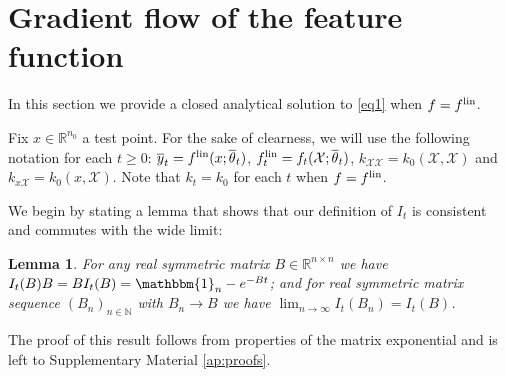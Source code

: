 \documentclass{article}
\newtheorem{lem}[thm]{Lemma}
\newtheorem{prop}[thm]{Proposition}
\theoremstyle{definition}
\theoremstyle{remark}
\numberwithin{equation}{section}
\newcommand{\X}{\mathcal{X}}
\newcommand{\R}{\mathbb{R}}
\newcommand{\N}{\mathbb{N}}
\newcommand{\ktest}{k_{x\X}}
\newcommand{\ktrain}{k_{\X\X}}
\newcommand{\lin}{{\textup{lin}}}
\newcommand{\norm}[2]{
    \|#1\|_{#2}
}
\begin{document}

\newpage

\appendix

\section{Gradient flow of the feature function}
\label{ap:eq1}

In this section we provide a closed analytical solution to \eqref{eq1} when $f = f^\lin$.

Fix $x \in \R^{n_0}$ a test point.
For the sake of clearness, we will use the following notation for each $t\ge 0$: $\overline y_t=f^\lin(x;\overline \theta_t)$, $f^\lin_t=f_t(\X;\overline \theta_t)$, $\ktrain = k_0(\X,\X)$ and $\ktest = k_0(x,\X)$.
Note that $k_t=k_0$ for each $t$ when $f=f^\lin$.

We begin by stating a lemma that shows that our definition of $I_t$ is consistent and commutes with the wide limit:
\begin{lem}\label{lem_It_properties}
    For any real symmetric matrix $B \in \R^{n \times n}$ we have $I_t(B)B=BI_t(B) = \mathbbm{1}_n - e^{-Bt}$; and for real symmetric matrix sequence $(B_n)_{n\in\N}$ with $B_n\to B$ we have $\lim_{n\to \infty}I_t(B_n)=I_t(B)$.
\end{lem}
The proof of this result follows from properties of the matrix exponential and is left to Supplementary Material \ref{ap:proofs}.

\end{document}
